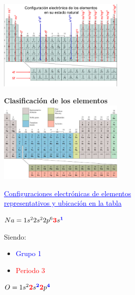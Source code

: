         \begin{center} \includegraphics[width=6cm]{./imagenes/configuracionElectronicaElementosEstadoNatural.png} \end{center}
        \begin{center} \textbf{Clasificación de los elementos} \\[10pt] \includegraphics[width=6cm]{./imagenes/clasificacionELementos.png} \end{center}
        
    \begin{center} \textcolor{blue}{\underline{Configuraciones electrónicas de elementos}} \\ \textcolor{blue}{\underline{representativos y ubicación en la tabla}} \end{center}

        \begin{center} 
            $Na = 1s^2 2s^2 2p^6 \text{\textcolor{red}{\textbf{3}}}s^\text{\textcolor{blue}{\textbf{1}}}$ 
        \end{center}

        Siendo: 
        \begin{itemize}
            \item \textcolor{blue}{Grupo 1}
            \item \textcolor{red}{Periodo 3}
        \end{itemize}
            
        \begin{center} 
            $O = 1s^2 \text{\textcolor{red}{\textbf{2}}}s^\text{\textcolor{blue}{\textbf{2}}} \text{\textcolor{red}{\textbf{2}}}p^\text{\textcolor{blue}{\textbf{4}}}$ 
        \end{center}

